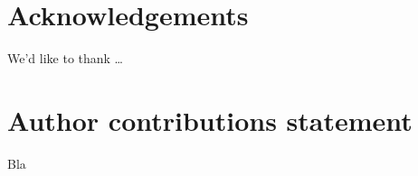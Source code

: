 \documentclass[english, twocolumn, 10pt, aps, superscriptaddress, floatfix, prb, citeautoscript]{revtex4-1}
\begin{document}
\section*{Acknowledgements}
We'd like to thank \ldots{}

\section*{Author contributions statement}
Bla




\end{document}
